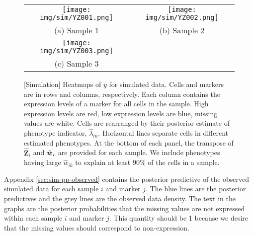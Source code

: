 \documentclass[12pt,]{article}
\def\beginmyfig{\begin{figure}[H]\center}
\def\endmyfig{\end{figure}}
\def\Z{\bm{Z}}
\newcommand{\true}{{\mbox{\tiny TR}}}
\newcommand{\bZ}{\mbox{\boldmath $Z$}}
\newcommand{\bw}{\mbox{\boldmath $w$}}
\def\beginmyfig{\begin{figure}[H]\center}
\def\endmyfig{\end{figure}}
\begin{document}
\begin{figure}[th!]
  \begin{center}
  \begin{tabular}{cc}
  \texttt{[image: img/sim/YZ001.png]}&
  \texttt{[image: img/sim/YZ002.png]}\\
  (a) Sample 1 & (b) Sample 2\\
  \texttt{[image: img/sim/YZ003.png]}&\\
  (c) Sample 3 & \\
  \end{tabular}
  \end{center}
  \vspace{-0.05in}
  \caption{[Simulation]  Heatmaps of $y$ for simulated data. Cells and markers
  are in rows and columns, respectively. Each column contains the expression
  levels of a marker for all cells in the sample. High expression levels are
  red, low expression levels are blue, missing values are white.   Cells are
  rearranged by their posterior estimate of phenotype indicator,
  $\hat{\lambda}_{in}$.   Horizontal lines separate cells in different
  estimated phenotypes.  At the bottom of each panel, the transpose of
  $\hat{\Z}_i$ and $\hat{\bw}_i$ are provided for each sample. We include
  phenotypes having large $\hat{w}_{ik}$ to explain at least 90\% of the cells
  in a sample.
}
\label{fig:sim-post-Z}
\end{figure}






Appendix \ref{sec:sim-pp-observed} contains the posterior predictive of the
observed simulated data for each sample $i$ and marker $j$. The blue lines are
the posterior predictives and the grey lines are the observed data density. The
text in the graphs are the posterior probabilities that the missing values are
not expressed within each sample $i$ and marker $j$. This quantity should be 1
because we desire that the missing values should correspond to non-expression.
\end{document}
